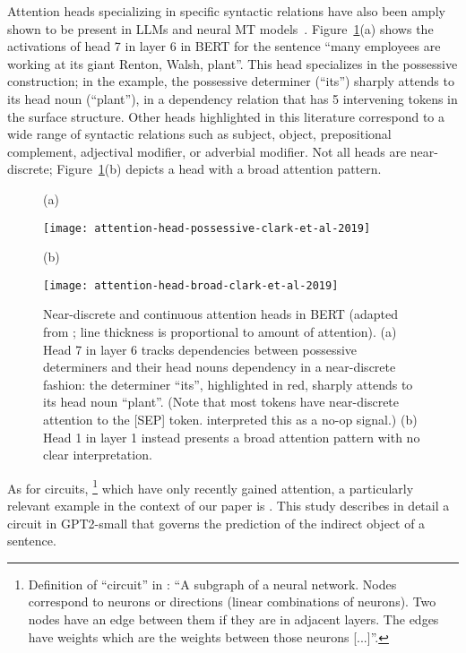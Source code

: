 Attention heads specializing in specific syntactic relations have also been amply shown to be present in LLMs and neural MT models~\cite{raganato-tiedemann-2018-analysis,clark-etal-2019-bert,htut2019attentionheadsberttrack,voita-etal-2019-analyzing,krzyzanowski+24}.
Figure~\ref{fig:det-noun}(a) shows the activations of head 7 in layer 6 in BERT for the sentence ``many employees are working at its giant Renton, Walsh, plant''. This head specializes in the possessive construction; in the example, the possessive determiner (``its'') sharply attends to its head noun (``plant''), in a dependency relation that has 5 intervening tokens in the surface structure.
Other heads highlighted in this literature correspond to a wide range of syntactic relations such as subject, object, prepositional complement, adjectival modifier, or adverbial modifier.
Not all heads are near-discrete; Figure~\ref{fig:det-noun}(b) depicts a head with a broad attention pattern.

\begin{figure}[tb]
  \centering

  (a)
  
  \texttt{[image: attention-head-possessive-clark-et-al-2019]}

  (b)
  \vspace{.1cm}

  \texttt{[image: attention-head-broad-clark-et-al-2019]}
  
  \caption{Near-discrete and continuous attention heads in BERT (adapted from \citet{clark-etal-2019-bert}; line thickness is proportional to amount of attention). (a) Head 7 in layer 6 tracks dependencies between possessive determiners and their head nouns dependency in a near-discrete fashion: the determiner ``its'', highlighted in red, sharply attends to its head noun ``plant''. (Note that most tokens have near-discrete attention to the [SEP] token. \citet{clark-etal-2019-bert} interpreted this as a no-op signal.) (b) Head 1 in layer 1 instead presents a broad attention pattern with no clear interpretation.}
  \label{fig:det-noun}
\end{figure}

As for circuits,
\footnote{Definition of ``circuit'' in \citet{olah2020zoom}: ``A subgraph of a neural network. Nodes correspond to neurons or directions (linear combinations of neurons). Two nodes have an edge between them if they are in adjacent layers. The edges have weights which are the weights between those neurons [...]''.}
which have only recently gained attention, a particularly relevant example in the context of our paper is \citet{wang2023interpretability}.
This study describes in detail a circuit in GPT2-small that governs the prediction of the indirect object of a sentence.

